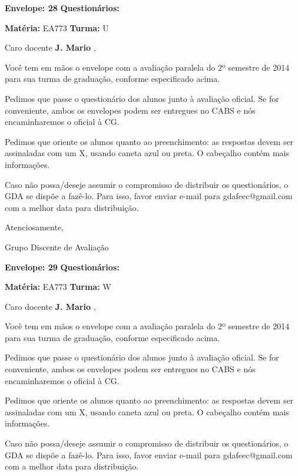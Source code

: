 \documentclass[a5paper]{letter}
\begin{document}
\vspace{0.5cm}

{\bf Envelope: 28 }		\hfill	{\bf Questionários:} \hspace{2cm}

\newpage
\thispagestyle{empty}

\hfill {\bf Matéria:} EA773 {\bf Turma:} U

Caro docente {\bf J. Mario }, 

	Você tem em mãos o envelope com a avaliação paralela do 2º semestre de 2014 para sua turma de graduação, conforme especificado acima.

	Pedimos que passe o questionário dos alunos junto à avaliação oficial. Se for conveniente, ambos os envelopes podem ser entregues no CABS e nós encaminharemos o oficial à CG.

Pedimos que oriente os alunos quanto ao preenchimento: as respostas devem ser assinaladas com um X, usando caneta azul ou preta. O cabeçalho contém mais informações.

	Caso não possa/deseje assumir o compromisso de distribuir os questionários, o GDA se dispõe a fazê-lo. Para isso, favor enviar e-mail para gdafeec@gmail.com com a melhor data para distribuição.


Atenciosamente, 

Grupo Discente de Avaliação

\vspace{0.5cm}

{\bf Envelope: 29 }		\hfill	{\bf Questionários:} \hspace{2cm}

\newpage
\thispagestyle{empty}

\hfill {\bf Matéria:} EA773 {\bf Turma:} W

Caro docente {\bf J. Mario }, 

	Você tem em mãos o envelope com a avaliação paralela do 2º semestre de 2014 para sua turma de graduação, conforme especificado acima.

	Pedimos que passe o questionário dos alunos junto à avaliação oficial. Se for conveniente, ambos os envelopes podem ser entregues no CABS e nós encaminharemos o oficial à CG.

Pedimos que oriente os alunos quanto ao preenchimento: as respostas devem ser assinaladas com um X, usando caneta azul ou preta. O cabeçalho contém mais informações.

	Caso não possa/deseje assumir o compromisso de distribuir os questionários, o GDA se dispõe a fazê-lo. Para isso, favor enviar e-mail para gdafeec@gmail.com com a melhor data para distribuição.
\end{document}
